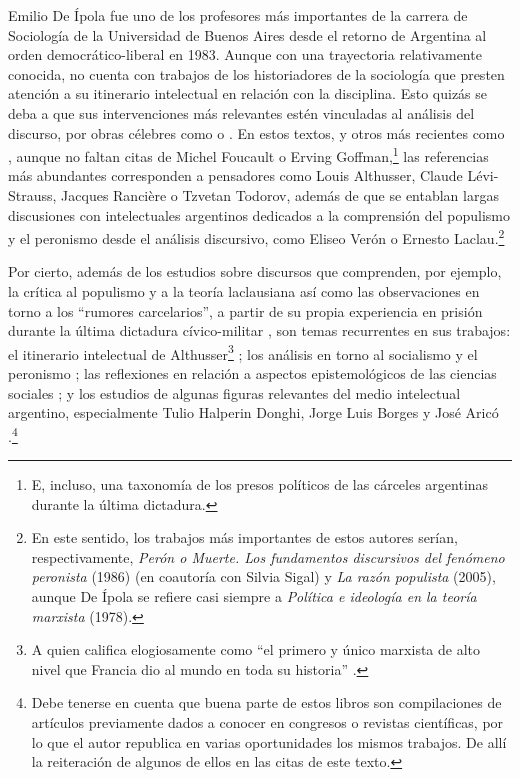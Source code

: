 {Emilio De Ípola fue uno de los profesores más importantes de la carrera de Sociología de la Universidad de Buenos Aires desde el retorno de Argentina al orden democrático-liberal en 1983. Aunque con una trayectoria relativamente conocida, no cuenta con trabajos de los historiadores de la sociología que presten atención a su itinerario intelectual en relación con la disciplina. Esto quizás se deba a que sus intervenciones más relevantes estén vinculadas al análisis del discurso, por obras célebres como  o . En estos textos, y otros más recientes como , aunque no faltan citas de Michel Foucault o Erving Goffman,\footnote{E, incluso, una taxonomía de los presos políticos de las cárceles argentinas durante la última dictadura.} las referencias más abundantes corresponden a pensadores como Louis Althusser, Claude Lévi-Strauss, Jacques Rancière o Tzvetan Todorov, además de que se entablan largas discusiones con intelectuales argentinos dedicados a la comprensión del populismo y el peronismo desde el análisis discursivo, como Eliseo Verón o Ernesto Laclau.\footnote{En este sentido, los trabajos más importantes de estos autores serían, respectivamente, \emph{Perón o Muerte. Los fundamentos discursivos del fenómeno peronista} (1986) (en coautoría con Silvia Sigal) y \emph{La razón populista} (2005), aunque De Ípola se refiere casi siempre a \emph{Política e ideología en la teoría marxista} (1978).}

Por cierto, además de los estudios sobre discursos \parencite{1586-DEIPOLA1982,1587-DEIPOLA1987,1588-DEIPOLA1989,1589-DEIPOLA2021,1590-DEIPOLA1982} que comprenden, por ejemplo, la crítica al populismo y a la teoría laclausiana \parencite{1539-PORTANTIERO1988,1586-DEIPOLA1982,1587-DEIPOLA1987,1588-DEIPOLA1989,1591-DEIPOLA2008} así como las observaciones en torno a los \enquote{rumores carcelarios}, a partir de su propia experiencia en prisión durante la última dictadura cívico-militar \parencite{1586-DEIPOLA1982,1592-DEIPOLA1997,1593-DEIPOLA2005,1589-DEIPOLA2021}, son temas recurrentes en sus trabajos: el itinerario intelectual de Althusser\footnote{A quien califica elogiosamente como \enquote{el primero y único marxista de alto nivel que Francia dio al mundo en toda su historia} \parencite[125]{1607-DEIPOLA2011}.}  \parencite{1594-DEIPOLA1974,1595-DEIPOLA2007,1607-DEIPOLA2011}; los análisis en torno al socialismo y el peronismo \parencite{1586-DEIPOLA1982,1596-DEIPOLA1987,1588-DEIPOLA1989,1597-DEIPOLA1990}; las reflexiones en relación a aspectos epistemológicos de las ciencias sociales \parencite{1556-CASTELLS1975,1557-CASTELLS1973,1598-DEIPOLA1969}; y los estudios de algunas figuras relevantes del medio intelectual argentino, especialmente Tulio Halperin Donghi, Jorge Luis Borges y José Aricó \parencite{1588-DEIPOLA1989,1592-DEIPOLA1997,1600-DEIPOLA2001}.\footnote{Debe tenerse en cuenta que buena parte de estos libros son compilaciones de artículos previamente dados a conocer en congresos o revistas científicas, por lo que el autor republica en varias oportunidades los mismos trabajos. De allí la reiteración de algunos de ellos en las citas de este texto.}

}
